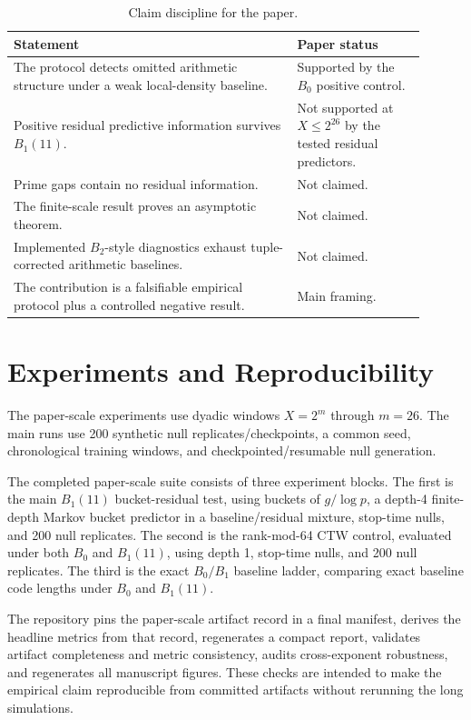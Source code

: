 \documentclass[11pt]{article}
\begin{document}
\begin{table}[ht]
\centering
\begin{tabular}{p{0.62\linewidth}p{0.28\linewidth}}
\toprule
Statement & Paper status \\
\midrule
The protocol detects omitted arithmetic structure under a weak local-density baseline. & Supported by the $B_0$ positive control. \\
Positive residual predictive information survives $B_1(11)$. & Not supported at $X\leq2^{26}$ by the tested residual predictors. \\
Prime gaps contain no residual information. & Not claimed. \\
The finite-scale result proves an asymptotic theorem. & Not claimed. \\
Implemented $B_2$-style diagnostics exhaust tuple-corrected arithmetic baselines. & Not claimed. \\
The contribution is a falsifiable empirical protocol plus a controlled negative result. & Main framing. \\
\bottomrule
\end{tabular}
\caption{Claim discipline for the paper.}
\label{tab:claim-discipline}
\end{table}

\section{Experiments and Reproducibility}

The paper-scale experiments use dyadic windows $X=2^m$ through $m=26$. The main runs use 200 synthetic null replicates/checkpoints, a common seed, chronological training windows, and checkpointed/resumable null generation.

The completed paper-scale suite consists of three experiment blocks. The first is the main $B_1(11)$ bucket-residual test, using buckets of $g/\log p$, a depth-4 finite-depth Markov bucket predictor in a baseline/residual mixture, stop-time nulls, and 200 null replicates. The second is the rank-mod-64 CTW control, evaluated under both $B_0$ and $B_1(11)$, using depth 1, stop-time nulls, and 200 null replicates. The third is the exact $B_0/B_1$ baseline ladder, comparing exact baseline code lengths under $B_0$ and $B_1(11)$.

The repository pins the paper-scale artifact record in a final manifest, derives the headline metrics from that record, regenerates a compact report, validates artifact completeness and metric consistency, audits cross-exponent robustness, and regenerates all manuscript figures. These checks are intended to make the empirical claim reproducible from committed artifacts without rerunning the long simulations.
\end{document}
